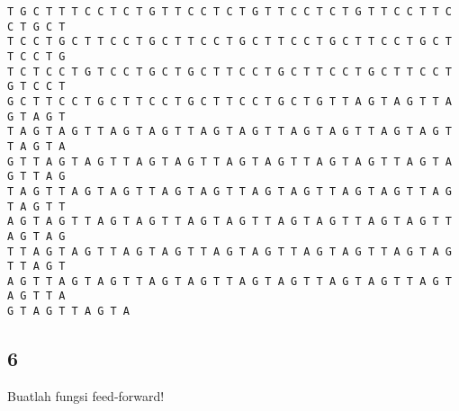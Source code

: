 \documentclass[11pt]{article}
\begin{document}
\begin{Verbatim}[commandchars=\\\{\}]
T G C T T T C C T C T G T T C C T C T G T T C C T C T G T T C C T T C C T G C T
T C C T G C T T C C T G C T T C C T G C T T C C T G C T T C C T G C T T C C T G
T C T C C T G T C C T G C T G C T T C C T G C T T C C T G C T T C C T G T C C T
G C T T C C T G C T T C C T G C T T C C T G C T G T T A G T A G T T A G T A G T
T A G T A G T T A G T A G T T A G T A G T T A G T A G T T A G T A G T T A G T A
G T T A G T A G T T A G T A G T T A G T A G T T A G T A G T T A G T A G T T A G
T A G T T A G T A G T T A G T A G T T A G T A G T T A G T A G T T A G T A G T T
A G T A G T T A G T A G T T A G T A G T T A G T A G T T A G T A G T T A G T A G
T T A G T A G T T A G T A G T T A G T A G T T A G T A G T T A G T A G T T A G T
A G T T A G T A G T T A G T A G T T A G T A G T T A G T A G T T A G T A G T T A
G T A G T T A G T A
    \end{Verbatim}

    \hypertarget{section}{%
\subsection{6}\label{section}}

Buatlah fungsi feed-forward!
\end{document}
